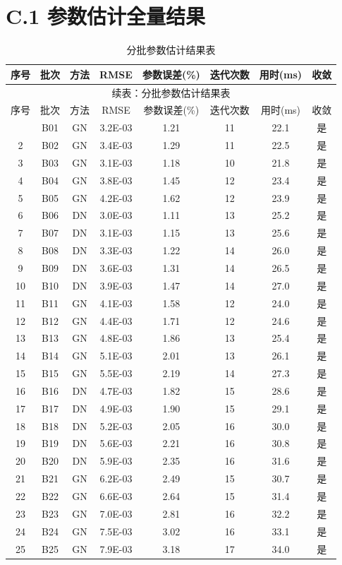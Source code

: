 \section*{C.1 参数估计全量结果}
{
\footnotesize
\begin{longtable}{cccccccc}
\caption{分批参数估计结果表}\\
\toprule
序号 & 批次 & 方法 & RMSE & 参数误差(\%) & 迭代次数 & 用时(ms) & 收敛\\
\midrule
\endfirsthead
\multicolumn{8}{c}{续表：分批参数估计结果表}\\
\toprule
序号 & 批次 & 方法 & RMSE & 参数误差(\%) & 迭代次数 & 用时(ms) & 收敛\\
\midrule
\endhead
\bottomrule
\endfoot
1&B01&GN&3.2E-03&1.21&11&22.1&是\\
2&B02&GN&3.4E-03&1.29&11&22.5&是\\
3&B03&GN&3.1E-03&1.18&10&21.8&是\\
4&B04&GN&3.8E-03&1.45&12&23.4&是\\
5&B05&GN&4.2E-03&1.62&12&23.9&是\\
6&B06&DN&3.0E-03&1.11&13&25.2&是\\
7&B07&DN&3.1E-03&1.15&13&25.6&是\\
8&B08&DN&3.3E-03&1.22&14&26.0&是\\
9&B09&DN&3.6E-03&1.31&14&26.5&是\\
10&B10&DN&3.9E-03&1.47&14&27.0&是\\
11&B11&GN&4.1E-03&1.58&12&24.0&是\\
12&B12&GN&4.4E-03&1.71&12&24.6&是\\
13&B13&GN&4.8E-03&1.86&13&25.4&是\\
14&B14&GN&5.1E-03&2.01&13&26.1&是\\
15&B15&GN&5.5E-03&2.19&14&27.3&是\\
16&B16&DN&4.7E-03&1.82&15&28.6&是\\
17&B17&DN&4.9E-03&1.90&15&29.1&是\\
18&B18&DN&5.2E-03&2.05&16&30.0&是\\
19&B19&DN&5.6E-03&2.21&16&30.8&是\\
20&B20&DN&5.9E-03&2.35&16&31.6&是\\
21&B21&GN&6.2E-03&2.49&15&30.7&是\\
22&B22&GN&6.6E-03&2.64&15&31.4&是\\
23&B23&GN&7.0E-03&2.81&16&32.2&是\\
24&B24&GN&7.5E-03&3.02&16&33.1&是\\
25&B25&GN&7.9E-03&3.18&17&34.0&是\\

\end{longtable}}
